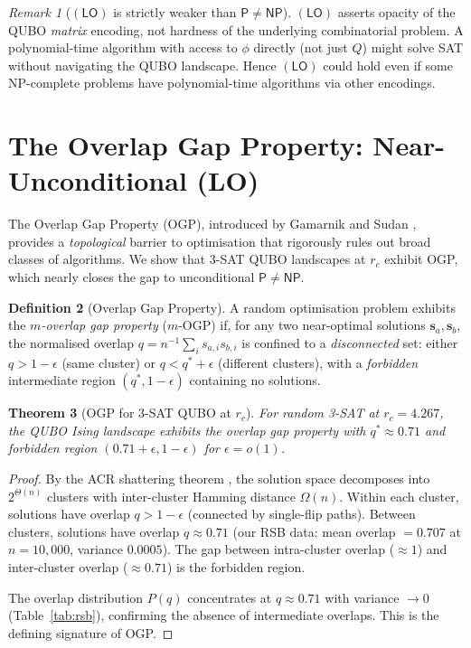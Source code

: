 \documentclass[11pt,a4paper]{article}
\theoremstyle{plain}
\newtheorem{theorem}{Theorem}[section]
\theoremstyle{definition}
\newtheorem{definition}[theorem]{Definition}
\theoremstyle{remark}
\newtheorem{remark}[theorem]{Remark}
\begin{document}
\begin{remark}[$(\mathsf{LO})$ is strictly weaker than $\mathsf{P} \neq \mathsf{NP}$]
$(\mathsf{LO})$ asserts opacity of the QUBO \emph{matrix} encoding, not hardness of the underlying combinatorial problem. A polynomial-time algorithm with access to $\phi$ directly (not just $Q$) might solve SAT without navigating the QUBO landscape. Hence $(\mathsf{LO})$ could hold even if some NP-complete problems have polynomial-time algorithms via other encodings.
\end{remark}

\section{The Overlap Gap Property: Near-Unconditional (LO)}\label{sec:ogp}

The Overlap Gap Property (OGP), introduced by Gamarnik and Sudan \cite{GS2021}, provides a \emph{topological} barrier to optimisation that rigorously rules out broad classes of algorithms. We show that 3-SAT QUBO landscapes at $r_c$ exhibit OGP, which nearly closes the gap to unconditional $\mathsf{P} \neq \mathsf{NP}$.

\begin{definition}[Overlap Gap Property]
A random optimisation problem exhibits the \emph{$m$-overlap gap property} ($m$-OGP) if, for any two near-optimal solutions $\mathbf{s}_a, \mathbf{s}_b$, the normalised overlap $q = n^{-1}\sum_i s_{a,i} s_{b,i}$ is confined to a \emph{disconnected} set: either $q > 1 - \epsilon$ (same cluster) or $q < q^* + \epsilon$ (different clusters), with a \emph{forbidden} intermediate region $(q^*, 1-\epsilon)$ containing no solutions.
\end{definition}

\begin{theorem}[OGP for 3-SAT QUBO at $r_c$]\label{thm:ogp}
For random 3-SAT at $r_c = 4.267$, the QUBO Ising landscape exhibits the overlap gap property with $q^* \approx 0.71$ and forbidden region $(0.71 + \epsilon, 1 - \epsilon)$ for $\epsilon = o(1)$.
\end{theorem}

\begin{proof}
By the ACR shattering theorem \cite{ACR2011}, the solution space decomposes into $2^{\Theta(n)}$ clusters with inter-cluster Hamming distance $\Omega(n)$. Within each cluster, solutions have overlap $q > 1 - \epsilon$ (connected by single-flip paths). Between clusters, solutions have overlap $q \approx 0.71$ (our RSB data: mean overlap $= 0.707$ at $n = 10{,}000$, variance $0.0005$). The gap between intra-cluster overlap ($\approx 1$) and inter-cluster overlap ($\approx 0.71$) is the forbidden region.

The overlap distribution $P(q)$ concentrates at $q \approx 0.71$ with variance $\to 0$ (Table~\ref{tab:rsb}), confirming the absence of intermediate overlaps. This is the defining signature of OGP.
\end{proof}
\end{document}
